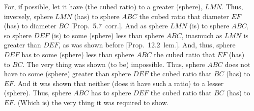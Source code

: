 \begin{Parallel}{}{}
{For, if possible, let it have (the cubed ratio) to a greater (sphere), $LMN$. Thus, inversely, sphere $LMN$
(has) to sphere $ABC$ the cubed ratio that diameter $EF$ (has) to diameter $BC$ [Prop.~5.7~corr.].
And as sphere $LMN$ (is) to sphere $ABC$, so sphere $DEF$ (is) to some (sphere) less than sphere $ABC$, inasmuch
as  $LMN$ is greater than $DEF$, as was shown before [Prop.~12.2~lem.]. And, thus, sphere
$DEF$ has to some (sphere) less than sphere $ABC$ the cubed ratio that $EF$ (has) to $BC$. The very thing
was shown (to be) impossible. Thus, sphere $ABC$ does not have to some (sphere) greater than sphere $DEF$
the cubed ratio that $BC$ (has) to $EF$. And it was shown that neither (does it have such a ratio) to a lesser
(sphere). Thus, sphere $ABC$ has to sphere $DEF$ the cubed ratio that $BC$ (has) to $EF$. (Which is)
the very thing it was required to show.}
\end{Parallel}